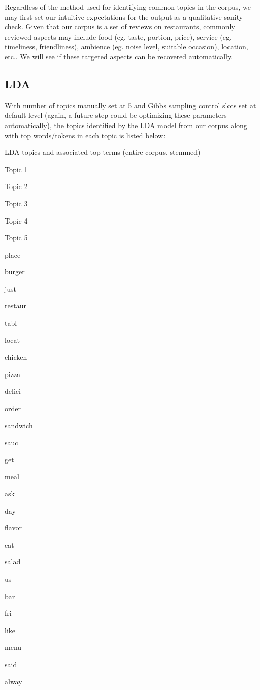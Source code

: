 \documentclass[12pt,twoside]{dukestatscithesis}
\theoremstyle{definition}
\theoremstyle{definition}
\theoremstyle{definition}
\theoremstyle{remark}
\begin{document}
Regardless of the method used for identifying common topics in the
corpus, we may first set our intuitive expectations for the output as a
qualitative sanity check. Given that our corpus is a set of reviews on
restaurants, commonly reviewed aspects may include food (eg. taste,
portion, price), service (eg. timeliness, friendliness), ambience (eg.
noise level, suitable occasion), location, etc.. We will see if these
targeted aspects can be recovered automatically.

\subsection{LDA}\label{lda}

With number of topics manually set at 5 and Gibbs sampling control slots
set at default level (again, a future step could be optimizing these
parameters automatically), the topics identified by the LDA model from
our corpus along with top words/tokens in each topic is listed below:

\label{tab:LDA-result}LDA topics and associated top terms (entire corpus,
stemmed)

Topic 1

Topic 2

Topic 3

Topic 4

Topic 5

place

burger

just

restaur

tabl

locat

chicken

pizza

delici

order

sandwich

sauc

get

meal

ask

day

flavor

eat

salad

us

bar

fri

like

menu

said

alway
\end{document}

